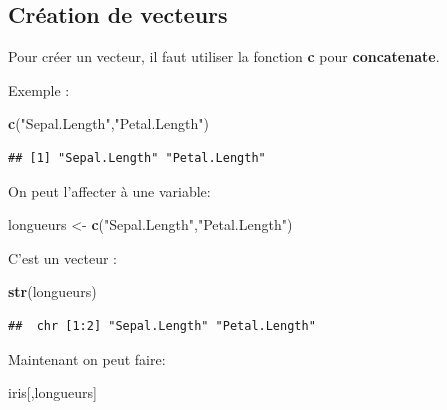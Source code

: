 \documentclass[
]{book}
\newenvironment{Shaded}{\begin{snugshade}}{\end{snugshade}}
\newcommand{\FunctionTok}[1]{\textcolor[rgb]{0.13,0.29,0.53}{\textbf{#1}}}
\newcommand{\NormalTok}[1]{#1}
\newcommand{\OtherTok}[1]{\textcolor[rgb]{0.56,0.35,0.01}{#1}}
\newcommand{\StringTok}[1]{\textcolor[rgb]{0.31,0.60,0.02}{#1}}
\begin{document}
\hypertarget{cruxe9ation-de-vecteurs}{%
\subsection{Création de vecteurs}\label{cruxe9ation-de-vecteurs}}

Pour créer un vecteur, il faut utiliser la fonction \textbf{c} pour \textbf{concatenate}.

Exemple :

\begin{Shaded}
\begin{Highlighting}[]
\FunctionTok{c}\NormalTok{(}\StringTok{"Sepal.Length"}\NormalTok{,}\StringTok{"Petal.Length"}\NormalTok{)}
\end{Highlighting}
\end{Shaded}

\begin{verbatim}
## [1] "Sepal.Length" "Petal.Length"
\end{verbatim}

On peut l'affecter à une variable:

\begin{Shaded}
\begin{Highlighting}[]
\NormalTok{longueurs }\OtherTok{\textless{}{-}} \FunctionTok{c}\NormalTok{(}\StringTok{"Sepal.Length"}\NormalTok{,}\StringTok{"Petal.Length"}\NormalTok{)}
\end{Highlighting}
\end{Shaded}

C'est un vecteur :

\begin{Shaded}
\begin{Highlighting}[]
\FunctionTok{str}\NormalTok{(longueurs)}
\end{Highlighting}
\end{Shaded}

\begin{verbatim}
##  chr [1:2] "Sepal.Length" "Petal.Length"
\end{verbatim}

Maintenant on peut faire:

\begin{Shaded}
\begin{Highlighting}[]
\NormalTok{iris[,longueurs]}
\end{Highlighting}
\end{Shaded}
\end{document}
